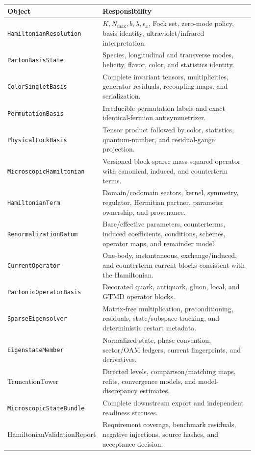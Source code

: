 \documentclass[11pt]{article}
\newcommand{\StateBundle}{\texttt{MicroscopicStateBundle}}
\newcommand{\Ham}{\texttt{MicroscopicHamiltonian}}
\newcommand{\RenDatum}{\texttt{RenormalizationDatum}}
\begin{document}
\begin{longtable}{L{0.27\textwidth}L{0.65\textwidth}}
\toprule
Object & Responsibility\\
\midrule
\endhead
\texttt{HamiltonianResolution} & \(K,N_{\max},b,\lambda,\epsilon_x\), Fock
set, zero-mode policy, basis identity, ultraviolet/infrared interpretation.\\
\texttt{PartonBasisState} & Species, longitudinal and transverse modes,
helicity, flavor, color, and statistics identity.\\
\texttt{ColorSingletBasis} & Complete invariant tensors, multiplicities,
generator residuals, recoupling maps, and serialization.\\
\texttt{PermutationBasis} & Irreducible permutation labels and exact
identical-fermion antisymmetrizer.\\
\texttt{PhysicalFockBasis} & Tensor product followed by color, statistics,
quantum-number, and residual-gauge projection.\\
\Ham & Versioned block-sparse mass-squared operator with canonical, induced,
and counterterm terms.\\
\texttt{HamiltonianTerm} & Domain/codomain sectors, kernel, symmetry,
regulator, Hermitian partner, parameter ownership, and provenance.\\
\RenDatum & Bare/effective parameters, counterterms, induced coefficients,
conditions, schemes, operator maps, and remainder model.\\
\texttt{CurrentOperator} & One-body, instantaneous, exchange/induced, and
counterterm current blocks consistent with the Hamiltonian.\\
\texttt{PartonicOperatorBasis} & Decorated quark, antiquark, gluon, local,
and GTMD operator blocks.\\
\texttt{SparseEigensolver} & Matrix-free multiplication, preconditioning,
residuals, state/subspace tracking, and deterministic restart metadata.\\
\texttt{EigenstateMember} & Normalized state, phase convention, sector/OAM
ledgers, current fingerprints, and derivatives.\\
{\small\ttfamily Truncation\allowbreak Tower} & Directed levels, comparison/matching maps, refits, convergence
models, and model-discrepancy estimates.\\
\StateBundle & Complete downstream export and independent readiness statuses.\\
{\small\ttfamily Hamiltonian\allowbreak Validation\allowbreak Report} & Requirement coverage, benchmark
residuals, negative injections, source hashes, and acceptance decision.\\
\bottomrule
\end{longtable}
\end{document}
